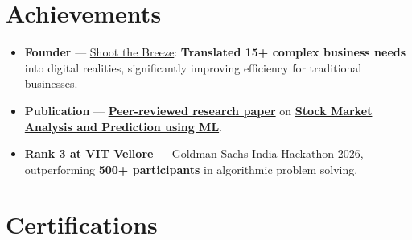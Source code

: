 \documentclass[a4paper,11pt]{article}
\newcommand{\ulink}[2]{\href{#1}{#2}}
\begin{document}
\section{Achievements}
\vspace{2pt}

\begin{itemize}[nosep, leftmargin=1.5em, itemsep=2pt, topsep=2pt]
  \item {\color[HTML]{0A0A0A}\fontsize{11}{14}\selectfont \textbf{Founder} --- \ulink{https://shoot-the-breeze.vercel.app}{Shoot the Breeze}: \textbf{Translated 15+ complex business needs} into digital realities, significantly improving efficiency for traditional businesses.}
  \item {\color[HTML]{0A0A0A}\fontsize{11}{14}\selectfont \textbf{Publication} --- \ulink{https://www.elruha.org/_files/ugd/614b1f_6b95e1b697bf452b9907ba46e0151c05.pdf\#page=774}{\textbf{Peer-reviewed research paper}} on \ulink{https://github.com/su-jin1425/Set-Project}{\textbf{Stock Market Analysis and Prediction using ML}}.}
  \item {\color[HTML]{0A0A0A}\fontsize{11}{14}\selectfont \textbf{Rank 3 at VIT Vellore} --- \ulink{https://www.hackerrank.com/contests/goldman-sachs-india-hackathon-2026-cs/leaderboard}{Goldman Sachs India Hackathon 2026}, outperforming \textbf{500+ participants} in algorithmic problem solving.}
\end{itemize}

\section{Certifications}
\vspace{2pt}
\end{document}
